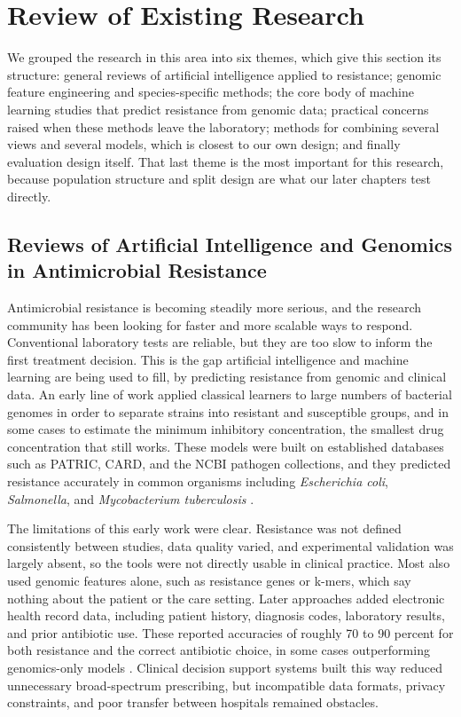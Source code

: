 \section{Review of Existing Research}
\label{sec:litreview}

We grouped the research in this area into six themes, which give this section its structure: general reviews of artificial intelligence applied to resistance; genomic feature engineering and species-specific methods; the core body of machine learning studies that predict resistance from genomic data; practical concerns raised when these methods leave the laboratory; methods for combining several views and several models, which is closest to our own design; and finally evaluation design itself. That last theme is the most important for this research, because population structure and split design are what our later chapters test directly.

\subsection{Reviews of Artificial Intelligence and Genomics in Antimicrobial Resistance}

Antimicrobial resistance is becoming steadily more serious, and the research community has been looking for faster and more scalable ways to respond. Conventional laboratory tests are reliable, but they are too slow to inform the first treatment decision. This is the gap artificial intelligence and machine learning are being used to fill, by predicting resistance from genomic and clinical data. An early line of work applied classical learners to large numbers of bacterial genomes in order to separate strains into resistant and susceptible groups, and in some cases to estimate the minimum inhibitory concentration, the smallest drug concentration that still works. These models were built on established databases such as PATRIC, CARD, and the NCBI pathogen collections, and they predicted resistance accurately in common organisms including \textit{Escherichia coli}, \textit{Salmonella}, and \textit{Mycobacterium tuberculosis} \cite{Kim2022, Li2024}.

The limitations of this early work were clear. Resistance was not defined consistently between studies, data quality varied, and experimental validation was largely absent, so the tools were not directly usable in clinical practice. Most also used genomic features alone, such as resistance genes or k-mers, which say nothing about the patient or the care setting. Later approaches added electronic health record data, including patient history, diagnosis codes, laboratory results, and prior antibiotic use. These reported accuracies of roughly 70 to 90 percent for both resistance and the correct antibiotic choice, in some cases outperforming genomics-only models \cite{Kim2022, Sakagianni2023}. Clinical decision support systems built this way reduced unnecessary broad-spectrum prescribing, but incompatible data formats, privacy constraints, and poor transfer between hospitals remained obstacles.


